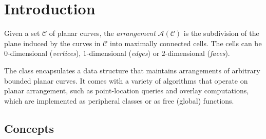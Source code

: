 \section*{Introduction}
\label{arr_ref_sec:intro}
Given a set $\mathcal{C}$ of planar curves, the {\em arrangement}
${\mathcal A}({\mathcal C})$ is the subdivision of the plane induced
by the curves in $\mathcal{C}$ into maximally connected cells. The cells
can be $0$-dimensional ({\em vertices}), $1$-dimensional ({\em edges})
or $2$-dimensional ({\em faces}).

The class  encapsulates a data structure
that maintains arrangements of arbitrary bounded planar curves. It comes
with a variety of algorithms that operate on planar arrangement,
such as point-location queries and overlay computations, which are
implemented as peripheral classes or as free (global) functions.

\subsection*{Concepts}

\\
\\
\\
\\
\\
\\
~\\
\\
\\
\\
\\
~\\
\\
 \\
\\
~\\
\\

